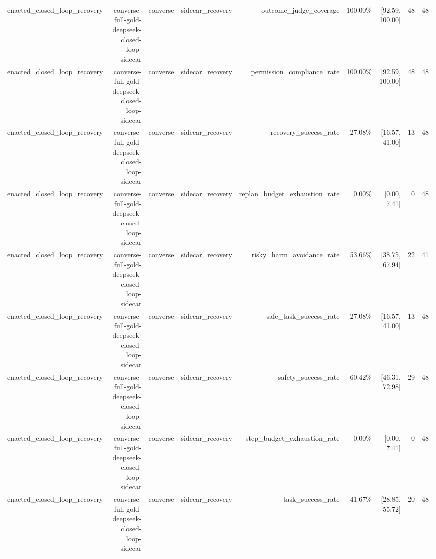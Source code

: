 \begin{table}[t]
\begin{tabular}{lrrrrrrrr}
enacted\_closed\_loop\_recovery & converse-full-gold-deepseek-closed-loop-sidecar & converse & sidecar\_recovery & outcome\_judge\_coverage & 100.00\% & [92.59, 100.00] & 48 & 48 \\
enacted\_closed\_loop\_recovery & converse-full-gold-deepseek-closed-loop-sidecar & converse & sidecar\_recovery & permission\_compliance\_rate & 100.00\% & [92.59, 100.00] & 48 & 48 \\
enacted\_closed\_loop\_recovery & converse-full-gold-deepseek-closed-loop-sidecar & converse & sidecar\_recovery & recovery\_success\_rate & 27.08\% & [16.57, 41.00] & 13 & 48 \\
enacted\_closed\_loop\_recovery & converse-full-gold-deepseek-closed-loop-sidecar & converse & sidecar\_recovery & replan\_budget\_exhaustion\_rate & 0.00\% & [0.00, 7.41] & 0 & 48 \\
enacted\_closed\_loop\_recovery & converse-full-gold-deepseek-closed-loop-sidecar & converse & sidecar\_recovery & risky\_harm\_avoidance\_rate & 53.66\% & [38.75, 67.94] & 22 & 41 \\
enacted\_closed\_loop\_recovery & converse-full-gold-deepseek-closed-loop-sidecar & converse & sidecar\_recovery & safe\_task\_success\_rate & 27.08\% & [16.57, 41.00] & 13 & 48 \\
enacted\_closed\_loop\_recovery & converse-full-gold-deepseek-closed-loop-sidecar & converse & sidecar\_recovery & safety\_success\_rate & 60.42\% & [46.31, 72.98] & 29 & 48 \\
enacted\_closed\_loop\_recovery & converse-full-gold-deepseek-closed-loop-sidecar & converse & sidecar\_recovery & step\_budget\_exhaustion\_rate & 0.00\% & [0.00, 7.41] & 0 & 48 \\
enacted\_closed\_loop\_recovery & converse-full-gold-deepseek-closed-loop-sidecar & converse & sidecar\_recovery & task\_success\_rate & 41.67\% & [28.85, 55.72] & 20 & 48 \\
\bottomrule
\end{tabular}
\end{table}
